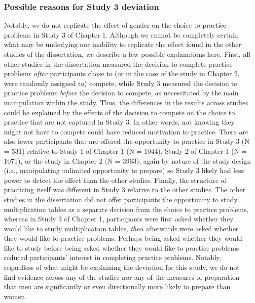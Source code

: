 \documentclass[a4paper, nobind]{templates/ociamthesis}
\begin{document}
\hypertarget{possible-reasons-for-study-3-deviation}{%
\subsubsection{Possible reasons for Study 3 deviation}\label{possible-reasons-for-study-3-deviation}}

Notably, we do not replicate the effect of gender on the choice to practice problems in Study 3 of Chapter 1. Although we cannot be completely certain what may be underlying our inability to replicate the effect found in the other studies of the dissertation, we describe a few possible explanations here. First, all other studies in the dissertation measured the decision to complete practice problems \emph{after} participants chose to (or in the case of the study in Chapter 2, were randomly assigned to) compete, while Study 3 measured the decision to practice problems \emph{before} the decision to compete, as necessitated by the main manipulation within the study. Thus, the differences in the results across studies could be explained by the effects of the decision to compete on the choice to practice that are not captured in Study 3. In other words, not knowing they might not have to compete could have reduced motivation to practice. There are also fewer participants that are offered the opportunity to practice in Study 3 (N = 531) relative to Study 1 of Chapter 1 (N = 1044), Study 2 of Chapter 1 (N = 1071), or the study in Chapter 2 (N = 3963), again by nature of the study design (i.e., manipulating unlimited opportunity to prepare) so Study 3 likely had less power to detect the effect than the other studies. Finally, the structure of practicing itself was different in Study 3 relative to the other studies. The other studies in the dissertation did not offer participants the opportunity to study multiplication tables as a separate decision from the choice to practice problems, whereas in Study 3 of Chapter 1, participants were first asked whether they would like to study multiplication tables, \emph{then} afterwards were asked whether they would like to practice problems. Perhaps being asked whether they would like to study before being asked whether they would like to practice problems reduced participants' interest in completing practice problems. Notably, regardless of what might be explaining the deviation for this study, we do not find evidence across any of the studies nor any of the measures of preparation that men are significantly or even directionally more likely to prepare than women.
\end{document}
